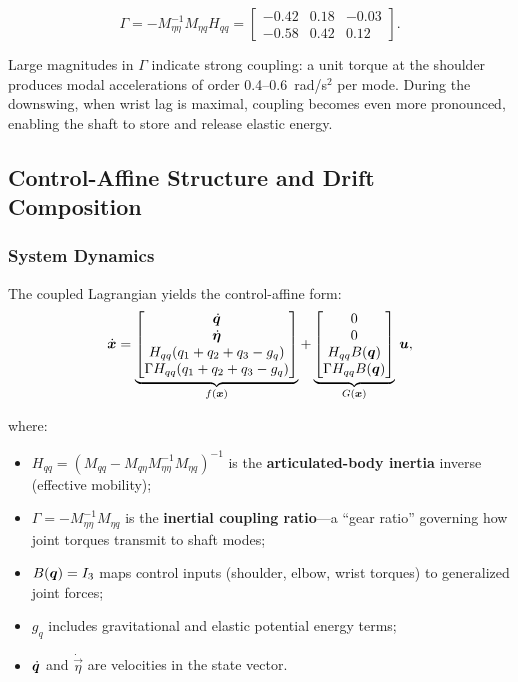 \begin{equation}
\Gamma = -M_{\eta\eta}^{-1}M_{\eta q} H_{qq} =
\begin{bmatrix}
-0.42 & 0.18 & -0.03 \\
-0.58 & 0.42 & 0.12
\end{bmatrix}.
\label{eq:ch8:Gamma-numeric}
\end{equation}

Large magnitudes in $\Gamma$ indicate strong coupling: a unit torque at the shoulder
produces modal accelerations of order 0.4--0.6~rad/s$^2$ per mode. During the downswing,
when wrist lag is maximal, coupling becomes even more pronounced, enabling the shaft
to store and release elastic energy.

\subsection{Control-Affine Structure and Drift Composition}

\subsubsection{System Dynamics}

The coupled Lagrangian yields the control-affine form:
\begin{equation}
\dot{\bm{x}} = \underbrace{\begin{bmatrix}
\dot{\bm{q}} \\ \dot{\bm{\eta}} \\
H_{qq}(q_1 + q_2 + q_3 - g_q) \\
\Gamma H_{qq}(q_1 + q_2 + q_3 - g_q)
\end{bmatrix}}_{f(\bm{x})}
+ \underbrace{\begin{bmatrix}
0 \\ 0 \\
H_{qq}B(\bm{q}) \\ \Gamma H_{qq}B(\bm{q})
\end{bmatrix}}_{G(\bm{x})}\,\bm{u},
\label{eq:ch8:golf-affine}
\end{equation}

where:
\begin{itemize}
\item $H_{qq} = (M_{qq}-M_{q\eta}M_{\eta\eta}^{-1}M_{\eta q})^{-1}$ is the
\textbf{articulated-body inertia} inverse (effective mobility);
\item $\Gamma = -M_{\eta\eta}^{-1}M_{\eta q}$ is the \textbf{inertial coupling ratio}---a
``gear ratio'' governing how joint torques transmit to shaft modes;
\item $B(\bm{q}) = I_3$ maps control inputs (shoulder, elbow, wrist torques) to generalized
joint forces;
\item $g_q$ includes gravitational and elastic potential energy terms;
\item $\dot{\bm{q}}$ and $\dot{\vec\eta}$ are velocities in the state vector.
\end{itemize}

